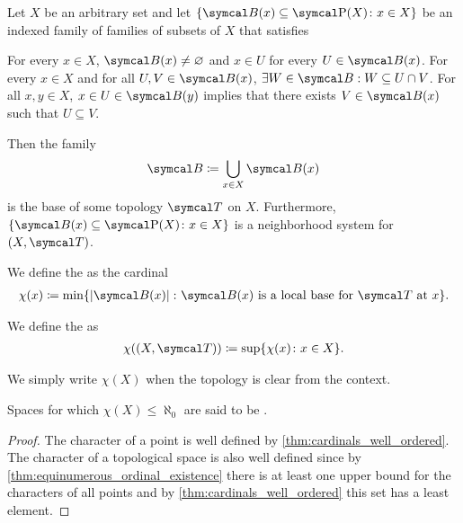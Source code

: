 \begin{proposition}\label{thm:topological_local_base_axioms}\cite[13]{Engelking1989}
  Let \( X \) be an arbitrary set and let \( \{ \Cal{B}(x) \subseteq \Power(X) \colon x \in X \} \) be an indexed family of families of subsets of \( X \) that satisfies
  \begin{description}
     For every \( x \in X \), \( \Cal{B}(x) \neq \varnothing \) and \( x \in U \) for every \( U \in \Cal{B}(x) \).
     For every \( x \in X \) and for all \( U, V \in \Cal{B}(x) \), \( \exists W \in \Cal{B}: W \subseteq U \cap V \).
     For all \( x, y \in X \), \( x \in U \in \Cal{B}(y) \) implies that there exists \( V \in \Cal{B}(x) \) such that \( U \subseteq V \).
  \end{description}

  Then the family
  \begin{align*}
    \Cal{B} \coloneqq \bigcup_{x \in X} \Cal{B}(x)
  \end{align*}
  is the base of some topology \( \Cal{T} \) on \( X \). Furthermore, \( \{ \Cal{B}(x) \subseteq \Power(X) \colon x \in X \} \) is a neighborhood system for \( (X, \Cal{T}) \).
\end{proposition}

\begin{definition}\label{def:topological_space_character}
  We define the  as the cardinal
  \begin{align*}
    \chi(x) \coloneqq \min \{ \Abs{\Cal{B(x)}} \colon \Cal{B(x)} \text{ is a local base for } \Cal{T} \text{ at } x \}.
  \end{align*}

  We define the  as
  \begin{align*}
    \chi((X, \Cal{T})) \coloneqq \sup \{ \chi(x) \colon x \in X \}.
  \end{align*}

  We simply write \( \chi(X) \) when the topology is clear from the context.

  Spaces for which \( \chi(X) \leq \aleph_0 \) are said to be .
\end{definition}
\begin{proof}
  The character of a point is well defined by \cref{thm:cardinals_well_ordered}. The character of a topological space is also well defined since by \cref{thm:equinumerous_ordinal_existence} there is at least one upper bound for the characters of all points and by \cref{thm:cardinals_well_ordered} this set has a least element.
\end{proof}

